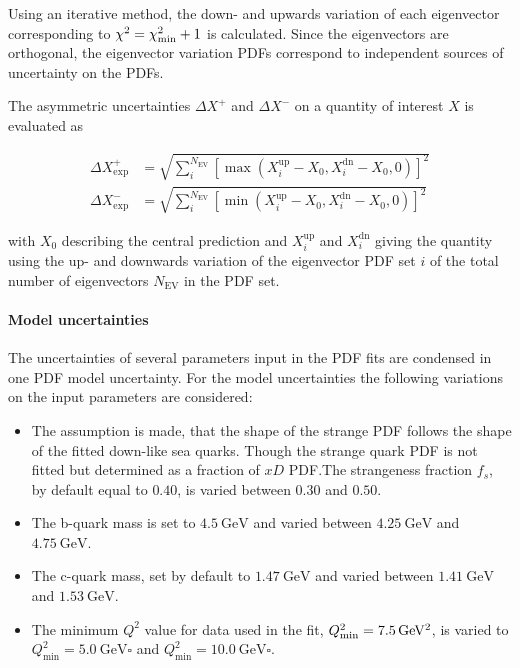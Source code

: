 Using an iterative method, the down- and upwards variation of each eigenvector
corresponding to $\chi^2 = \chi^2_{\mathrm{min}} + 1$ is calculated. Since the
eigenvectors are orthogonal, the eigenvector variation PDFs correspond to
independent sources of uncertainty on the PDFs.

The asymmetric uncertainties $\Delta X^+$ and $\Delta X^-$ on a quantity of
interest $X$ is evaluated as

\begin{align*}
  \Delta X^+_{\mathrm{exp}} &= \sqrt{\sum_i^{N_{\mathrm{EV}}} \left[ \max(X_i^{\mathrm{up}}
    -X_0, X_i^{\mathrm{dn}} - X_0, 0)\right]^2}\\
    \Delta X^-_{\mathrm{exp}} &= \sqrt{\sum_i^{N_{\mathrm{EV}}} \left[ \min(X_i^{\mathrm{up}} - X_0, X_i^{\mathrm{dn}} - X_0,0)\right]^2}
\end{align*}

with $X_0$ describing the central prediction and $X_i^{\mathrm{up}}$ and
$X_i^{\mathrm{dn}}$ giving the quantity using the up- and downwards variation of
the eigenvector PDF set $i$ of the total number of eigenvectors
$N_{\mathrm{EV}}$ in the PDF set.


\paragraph{Model uncertainties} The uncertainties of several parameters input in
the PDF fits are condensed in one PDF model uncertainty. For the model
uncertainties the following variations on the input parameters are considered:

\begin{itemize}
\item The assumption is made, that the shape of the strange PDF follows the
  shape of the fitted down-like sea quarks. Though the strange quark PDF is not
  fitted but determined as a fraction of $xD$ PDF.The strangeness fraction
  $f_s$, by default equal to $0.40$, is varied between $0.30$ and $0.50$.
  \item The b-quark mass is set to $\SI{4.5}{\GeV}$ and varied between
  $\SI{4.25}{\GeV}$ and $\SI{4.75}{\GeV}$.
  \item The c-quark mass, set by default to $\SI{1.47}{\GeV}$ and varied between
  $\SI{1.41}{\GeV}$ and $\SI{1.53}{\GeV}$.
  \item The minimum $Q^2$ value for data used in the fit,
    $Q^2_\mathrm{min}=\SI{7.5}{\GeVsq}$, is varied to $Q^2_\mathrm{min} =
    \SI{5.0}{\GeV\square}$ and $Q^2_\mathrm{min} = \SI{10.0}{\GeV\square}$.
\end{itemize}

